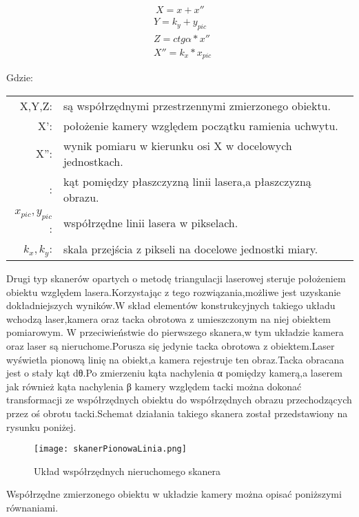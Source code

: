 \documentclass[12pt]{article}
\begin{document}
    


\begin{equation}
    \begin{aligned}
        & \ X=x+x'' \\
          & Y=k_{y}+y_{pic} \\
          & Z=ctg\alpha *x''\\
          & X''=k_{x} *x_{pic}\
    \end{aligned}
\end{equation}

Gdzie:\\
\hspace*{3em}
\begin{tabular}{rl}
    X,Y,Z:& są współrzędnymi przestrzennymi zmierzonego obiektu. \\
    X':& położenie kamery względem początku ramienia uchwytu. \\
    X'':& wynik pomiaru w kierunku osi X w docelowych jednostkach. \\
    \alpha:& kąt pomiędzy płaszczyzną linii lasera,a płaszczyzną obrazu. \\
    $x_{pic},y_{pic}$:& współrzędne linii lasera w pikselach. \\
    $k_{x},k_{y}$:& skala przejścia z pikseli na docelowe jednostki miary. \\
\end{tabular}
\newline
\newline
Drugi typ skanerów opartych o metodę triangulacji laserowej steruje położeniem obiektu względem lasera.Korzystając z tego rozwiązania,możliwe jest uzyskanie dokładniejszych wyników.W skład elementów konstrukcyjnych takiego układu wchodzą laser,kamera oraz tacka obrotowa z umieszczonym na niej obiektem pomiarowym.
W przeciwieństwie do pierwszego skanera,w tym układzie kamera oraz laser są nieruchome.Porusza się jedynie tacka obrotowa z obiektem.Laser wyświetla pionową linię na obiekt,a kamera rejestruje ten obraz.Tacka obracana jest o stały kąt dθ.Po zmierzeniu kąta nachylenia α pomiędzy kamerą,a laserem jak również kąta nachylenia β kamery względem tacki można dokonać transformacji ze współrzędnych obiektu do współrzędnych obrazu przechodzących przez oś obrotu tacki.Schemat działania takiego skanera został przedstawiony na rysunku poniżej.

\begin{figure}[H]
  \centering
  \texttt{[image: skanerPionowaLinia.png]}
  \caption{Układ współrzędnych nieruchomego skanera \cite{mikulski2013metody}}   
  \label{fig:picture}
\end{figure}
\newline
Współrzędne zmierzonego obiektu w układzie kamery można opisać poniższymi równaniami.
\end{document}
